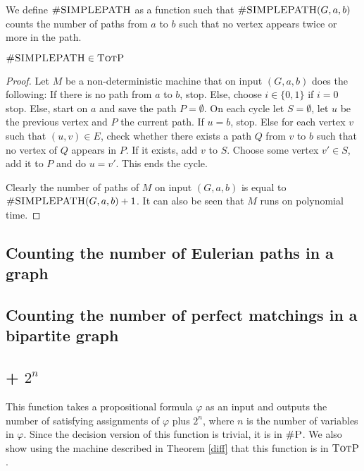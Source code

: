 We define $\textsc{\#SIMPLEPATH}$ as a function such that $\textsc{\#SIMPLEPATH}(G,a,b)$ counts the number of paths from $a$ to $b$ such that no vertex appears twice or more in the path.

\begin{coro}
	$\textsc{\#SIMPLEPATH} \in \textsc{TotP}$
\end{coro}
\begin{proof}
	Let $M$ be a non-deterministic machine that on input $(G,a,b)$ does the following: If there is no path from $a$ to $b$, stop. Else, choose $i\in\{0,1\}$ if $i = 0$ stop. Else, start on $a$ and save the path $P=\emptyset$. On each cycle let $S = \emptyset$, let $u$ be the previous vertex and $P$ the current path. If $u = b$, stop. Else for each vertex $v$ such that $(u,v)\in E$, check whether there exists a path $Q$ from $v$ to $b$ such that no vertex of $Q$ appears in $P$. If it exists, add $v$ to $S$. Choose some vertex $v'\in S$, add it to $P$ and do $u = v'$. This ends the cycle.
	
	Clearly the number of paths of $M$ on input $(G,a,b)$ is equal to $\textsc{\#SIMPLEPATH}(G,a,b)+1$. It can also be seen that $M$ runs on polynomial time.
\end{proof}


\subsection{Counting the number of Eulerian paths in a graph}

\subsection{Counting the number of perfect matchings in a bipartite graph}

\subsection{\shsat + $2^n$}

This function takes a propositional formula $\varphi$ as an input and outputs the number of satisfying assignments of $\varphi$ plus $2^n$, where $n$ is the number of variables in $\varphi$. Since the decision version of this function is trivial, it is in $\textsc{\#P}$. We also show using the machine described in Theorem \ref{diff} that this function is in $\textsc{TotP}$.